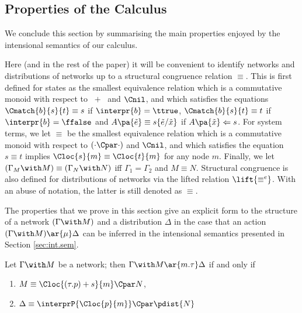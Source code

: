 \documentclass{LMCS}
\begin{document}
\subsection{Properties of the Calculus}
\label{sec:properties}
We conclude this section by summarising the main properties enjoyed by the 
intensional semantics of our calculus.

Here (and in the rest of the paper) 
it will be convenient to identify networks 
and distributions of networks
up to a structural congruence relation $\equiv$. This is first 
defined for states as the smallest equivalence relation which is 
a commutative monoid with 
respect to $\;+\;$ and $\Cnil$, and which satisfies the equations 
$\Cmatch{b}{s}{t} \equiv s$ if $\interpr{b} = \ttrue$, 
$\Cmatch{b}{s}{t} \equiv t$ if $\interpr{b} = \ffalse$ and 
$A\pa{\tilde{e}} \equiv s\{\tilde{e}/\tilde{x}\}$ if 
$A\pa{\tilde{x}} \Leftarrow s$.
For system terms, we let $\equiv$ 
be the smallest equivalence relation which is a commutative 
monoid with respect to $(\cdot\Cpar\cdot)$ and $\Cnil$, and which satisfies the 
equation $s \equiv t$ implies $\Cloc{s}{m} \equiv \Cloc{t}{m}$ 
for any node $m$. Finally, we let $(\Gamma_M \with M) \equiv 
(\Gamma_N \with N)$ iff $\Gamma_1 = \Gamma_2$ and $M \equiv N$. 
Structural congruence is also defined for distributions of 
networks via the lifted relation $\lift{\equiv^e}$. 
With an abuse of notation, the latter is still 
denoted as $\equiv$.

The properties that we prove in this section give an explicit 
form to the structure of a network $(\Gamma \with M)$ and 
a distribution $\Delta$ in the case that an action $(\Gamma \with M) 
\ar{\mu} \Delta$ can be inferred in the intensional semantics 
presented in Section \ref{sec:int.sem}.

\begin{prop}
\label{prop:tau}
Let $\Gamma \with M$ be a network; then 
$\Gamma \with M \ar{m.\tau} \Delta$ if and only if 
\begin{enumerate}[label=(\roman*)]
\item $M \equiv \Cloc{(\tau.p) + s}{m} \Cpar N$,
\item $\Delta \equiv \interprP{\Cloc{p}{m}} \Cpar \pdist{N}$
\end{enumerate}
\end{prop}
\end{document}
